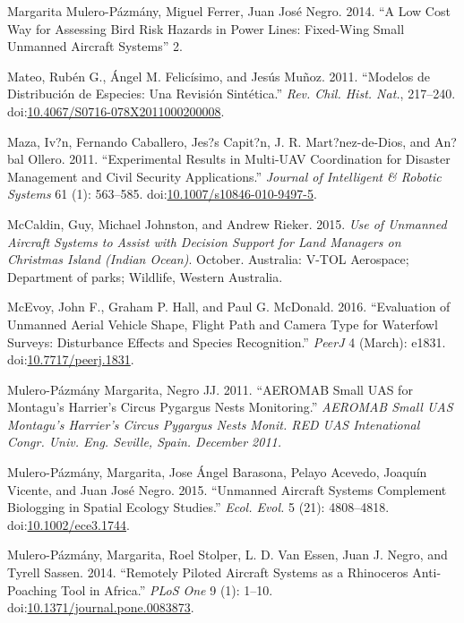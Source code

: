 \documentclass[]{interact}
\theoremstyle{plain}%
\theoremstyle{definition}
\theoremstyle{remark}
\begin{document}
\hypertarget{ref-margarita_mulero-pazmany_juan_jose_negro_low_2014}{}
Margarita Mulero-Pázmány, Miguel Ferrer, Juan José Negro. 2014. ``A Low
Cost Way for Assessing Bird Risk Hazards in Power Lines: Fixed-Wing
Small Unmanned Aircraft Systems'' 2.

\hypertarget{ref-mateo_modelos_2011}{}
Mateo, Rubén G., Ángel M. Felicísimo, and Jesús Muñoz. 2011. ``Modelos
de Distribución de Especies: Una Revisión Sintética.'' \emph{Rev. Chil.
Hist. Nat.}, 217--240.
doi:\href{https://doi.org/10.4067/S0716-078X2011000200008}{10.4067/S0716-078X2011000200008}.

\hypertarget{ref-maza_experimental_2011}{}
Maza, Iv?n, Fernando Caballero, Jes?s Capit?n, J. R. Mart?nez-de-Dios,
and An?bal Ollero. 2011. ``Experimental Results in Multi-UAV
Coordination for Disaster Management and Civil Security Applications.''
\emph{Journal of Intelligent \& Robotic Systems} 61 (1): 563--585.
doi:\href{https://doi.org/10.1007/s10846-010-9497-5}{10.1007/s10846-010-9497-5}.

\hypertarget{ref-mccaldin_use_2015}{}
McCaldin, Guy, Michael Johnston, and Andrew Rieker. 2015. \emph{Use of
Unmanned Aircraft Systems to Assist with Decision Support for Land
Managers on Christmas Island (Indian Ocean)}. October. Australia: V-TOL
Aerospace; Department of parks; Wildlife, Western Australia.

\hypertarget{ref-mcevoy_evaluation_2016}{}
McEvoy, John F., Graham P. Hall, and Paul G. McDonald. 2016.
``Evaluation of Unmanned Aerial Vehicle Shape, Flight Path and Camera
Type for Waterfowl Surveys: Disturbance Effects and Species
Recognition.'' \emph{PeerJ} 4 (March): e1831.
doi:\href{https://doi.org/10.7717/peerj.1831}{10.7717/peerj.1831}.

\hypertarget{ref-mulero-pazmany_margarita_aeromab_2011}{}
Mulero-Pázmány Margarita, Negro JJ. 2011. ``AEROMAB Small UAS for
Montagu's Harrier's Circus Pygargus Nests Monitoring.'' \emph{AEROMAB
Small UAS Montagu's Harrier's Circus Pygargus Nests Monit. RED UAS
Intenational Congr. Univ. Eng. Seville, Spain. December 2011.}

\hypertarget{ref-mulero-pazmany_unmanned_2015}{}
Mulero-Pázmány, Margarita, Jose Ángel Barasona, Pelayo Acevedo, Joaquín
Vicente, and Juan José Negro. 2015. ``Unmanned Aircraft Systems
Complement Biologging in Spatial Ecology Studies.'' \emph{Ecol. Evol.} 5
(21): 4808--4818.
doi:\href{https://doi.org/10.1002/ece3.1744}{10.1002/ece3.1744}.

\hypertarget{ref-mulero-pazmany_remotely_2014}{}
Mulero-Pázmány, Margarita, Roel Stolper, L. D. Van Essen, Juan J. Negro,
and Tyrell Sassen. 2014. ``Remotely Piloted Aircraft Systems as a
Rhinoceros Anti-Poaching Tool in Africa.'' \emph{PLoS One} 9 (1): 1--10.
doi:\href{https://doi.org/10.1371/journal.pone.0083873}{10.1371/journal.pone.0083873}.
\end{document}
